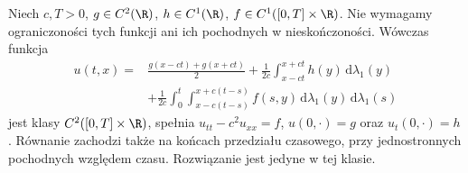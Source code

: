 \begin{twierdzenie}
\label{thm:pde5-forcing}
Niech $c,T>0$, $g\in C^2(\R)$, $h\in C^1(\R)$,
$f\in C^1([0,T]\times\R)$.
Nie wymagamy ograniczoności tych funkcji
ani ich pochodnych w nieskończoności.
Wówczas funkcja
\begin{equation}\label{eq:pde5-forcing}
\begin{aligned}
 u(t,x)={}&\frac{g(x-ct)+g(x+ct)}2
 +\frac1{2c}\int_{x-ct}^{x+ct}h(y)\,\mathrm d\lambda_1(y)\\
 &+\frac1{2c}\int_0^t\int_{x-c(t-s)}^{x+c(t-s)}
 f(s,y)\,\mathrm d\lambda_1(y)\,\mathrm d\lambda_1(s)
\end{aligned}
\end{equation}
jest klasy $C^2([0,T]\times\R)$, spełnia
$u_{tt}-c^2u_{xx}=f$, $u(0,\cdot)=g$
oraz $u_t(0,\cdot)=h$.
Równanie zachodzi także na końcach przedziału
czasowego, przy jednostronnych pochodnych
względem czasu. Rozwiązanie jest jedyne
w tej klasie.
\end{twierdzenie}
